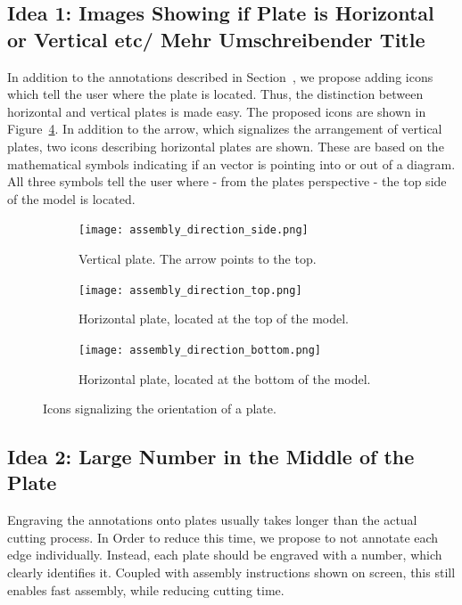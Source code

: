 \documentclass[../ClassicThesis.tex]{subfiles}
\begin{document}
\subsection{Idea 1: Images Showing if Plate is Horizontal or Vertical etc/ Mehr Umschreibender Title}

In addition to the annotations described in Section~, we propose adding icons which tell the user where the plate is located. Thus, the distinction between horizontal and vertical plates is made easy. The proposed icons are shown in Figure~\ref{fig:assemblyicons}. In addition to the arrow, which signalizes the arrangement of vertical plates, two icons describing horizontal plates are shown. These are based on the mathematical symbols indicating if an vector is pointing into or out of a diagram. All three symbols tell the user where - from the plates perspective - the top side of the model is located. 

\begin{figure}
  \centering
  \begin{subfigure}[b]{0.3\textwidth}
    \centering
    \texttt{[image: assembly\_direction\_side.png]}
    \caption{Vertical plate. The arrow points to the top.}
    \label{fig:assemblyicons:side}
  \end{subfigure}
  \begin{subfigure}[b]{0.3\textwidth}
    \centering
    \texttt{[image: assembly\_direction\_top.png]}
    \caption{Horizontal plate, located at the top of the model.}
    \label{fig:assemblyicons:top}
  \end{subfigure}
  \begin{subfigure}[b]{0.3\textwidth}
    \centering
    \texttt{[image: assembly\_direction\_bottom.png]}
    \caption{Horizontal plate, located at the bottom of the model.}
    \label{fig:assemblyicons:bottom}
  \end{subfigure}
  \caption{Icons signalizing the orientation of a plate.}
  \label{fig:assemblyicons}
\end{figure}

\subsection{Idea 2: Large Number in the Middle of the Plate}

Engraving the annotations onto plates usually takes longer than the actual cutting process. In Order to reduce this time, we propose to not annotate each edge individually. Instead, each plate should be engraved with a number, which clearly identifies it. Coupled with assembly instructions shown on screen, this still enables fast assembly, while reducing cutting time.
\end{document}

